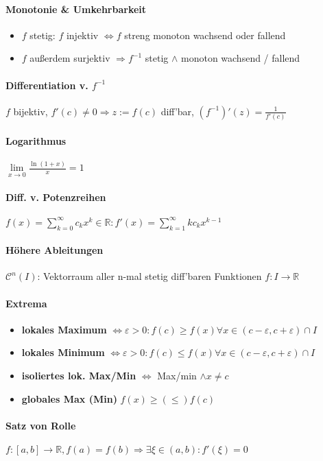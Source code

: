 \documentclass[paper=a3,paper=landscape, fontsize=9pt,DIV=25]{scrartcl}
\newcommand{\real}{{\mathbb{R}}}
\begin{document}
\begin{multicols*}{4}
			\paragraph{Monotonie \& Umkehrbarkeit}
			\begin{itemize}
				\item $f$ stetig: $f$ injektiv $\Leftrightarrow f$ streng monoton wachsend oder fallend
				\item $f$ außerdem surjektiv $\Rightarrow f^{-1}$ stetig $\wedge$ monoton wachsend / fallend
			\end{itemize}
			\paragraph{Differentiation v. $f^{-1}$}
			$f$ bijektiv, $f'(c) \neq 0 \Rightarrow z := f(c)$ diff'bar, $(f^{-1})'(z)=\frac{1}{f'(c)}$
			\paragraph{Logarithmus}
			$\lim\limits_{x\rightarrow0} \frac{\ln(1+x)}{x}=1$
			\paragraph{Diff. v. Potenzreihen}
			$ f(x)=\sum_{k=0}^{\infty}c_kx^k \in \real: f'(x)=\sum_{k=1}^{\infty}kc_kx^{k-1}$
			\paragraph{Höhere Ableitungen}
			$\mathscr{C}^n(I)$: Vektorraum aller n-mal stetig diff'baren Funktionen $f: I \rightarrow \real$
			\paragraph{Extrema}
			\begin{itemize}
				\item \textbf{lokales Maximum} $\Leftrightarrow \varepsilon > 0: f(c) \geq f(x) \forall x \in (c-\varepsilon,c+\varepsilon)\cap I$
				\item \textbf{lokales Minimum} $\Leftrightarrow \varepsilon > 0: f(c) \leq f(x) \forall x \in (c-\varepsilon,c+\varepsilon)\cap I$
				\item \textbf{isoliertes lok. Max/Min} $\Leftrightarrow$ Max/min $\wedge x \neq c$
				\item \textbf{globales Max (Min)} $f(x) \geq (\leq) f(c)$ 
			\end{itemize}
			\paragraph{Satz von Rolle}
			$f: [a,b] \rightarrow \real, f(a)=f(b) \Rightarrow \exists \xi \in (a,b): f'(\xi)=0$

\end{multicols*}
\end{document}
